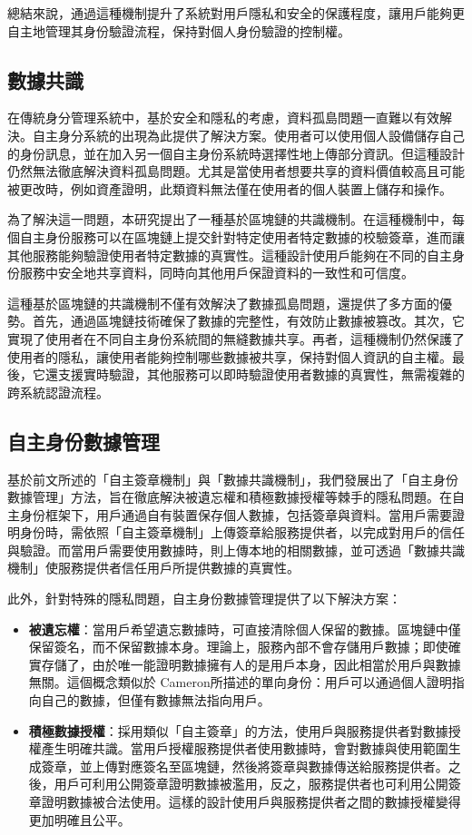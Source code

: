 總結來說，通過這種機制提升了系統對用戶隱私和安全的保護程度，讓用戶能夠更自主地管理其身份驗證流程，保持對個人身份驗證的控制權。
\subsection{數據共識}
在傳統身分管理系統中，基於安全和隱私的考慮，資料孤島問題一直難以有效解決。自主身分系統的出現為此提供了解決方案。使用者可以使用個人設備儲存自己的身份訊息，並在加入另一個自主身份系統時選擇性地上傳部分資訊。但這種設計仍然無法徹底解決資料孤島問題。尤其是當使用者想要共享的資料價值較高且可能被更改時，例如資產證明，此類資料無法僅在使用者的個人裝置上儲存和操作。

為了解決這一問題，本研究提出了一種基於區塊鏈的共識機制。在這種機制中，每個自主身份服務可以在區塊鏈上提交針對特定使用者特定數據的校驗簽章，進而讓其他服務能夠驗證使用者特定數據的真實性。這種設計使用戶能夠在不同的自主身份服務中安全地共享資料，同時向其他用戶保證資料的一致性和可信度。

這種基於區塊鏈的共識機制不僅有效解決了數據孤島問題，還提供了多方面的優勢。首先，通過區塊鏈技術確保了數據的完整性，有效防止數據被篡改。其次，它實現了使用者在不同自主身份系統間的無縫數據共享。再者，這種機制仍然保護了使用者的隱私，讓使用者能夠控制哪些數據被共享，保持對個人資訊的自主權。最後，它還支援實時驗證，其他服務可以即時驗證使用者數據的真實性，無需複雜的跨系統認證流程。
\subsection{自主身份數據管理}
基於前文所述的「自主簽章機制」與「數據共識機制」，我們發展出了「自主身份數據管理」方法，旨在徹底解決被遺忘權和積極數據授權等棘手的隱私問題。在自主身份框架下，用戶通過自有裝置保存個人數據，包括簽章與資料。當用戶需要證明身份時，需依照「自主簽章機制」上傳簽章給服務提供者，以完成對用戶的信任與驗證。而當用戶需要使用數據時，則上傳本地的相關數據，並可透過「數據共識機制」使服務提供者信任用戶所提供數據的真實性。

此外，針對特殊的隱私問題，自主身份數據管理提供了以下解決方案：
\begin{itemize}
  \item \textbf{被遺忘權}：當用戶希望遺忘數據時，可直接清除個人保留的數據。區塊鏈中僅保留簽名，而不保留數據本身。理論上，服務內部不會存儲用戶數據；即使確實存儲了，由於唯一能證明數據擁有人的是用戶本身，因此相當於用戶與數據無關。這個概念類似於 Cameron\cite{cameron2005laws}所描述的單向身份：用戶可以通過個人證明指向自己的數據，但僅有數據無法指向用戶。
  \item \textbf{積極數據授權}：採用類似「自主簽章」的方法，使用戶與服務提供者對數據授權產生明確共識。當用戶授權服務提供者使用數據時，會對數據與使用範圍生成簽章，並上傳對應簽名至區塊鏈，然後將簽章與數據傳送給服務提供者。之後，用戶可利用公開簽章證明數據被濫用，反之，服務提供者也可利用公開簽章證明數據被合法使用。這樣的設計使用戶與服務提供者之間的數據授權變得更加明確且公平。
\end{itemize}

